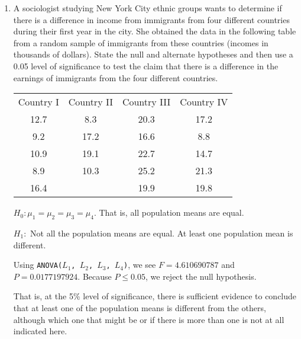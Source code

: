 \documentclass{article}
\begin{document}
\begin{enumerate}
\item A sociologist studying New York City ethnic groups wants to determine if there is a difference in income from immigrants from four different countries during their first year in the city.  She obtained the data in the following table from a random sample of immigrants from these countries (incomes in thousands of dollars).  State the null and alternate hypotheses and then use a 0.05 level of significance to test the claim that there is a difference in the earnings of immigrants from the four different countries. 

\begin{center}
\begin{tabular}{cccc}
Country I & Country II & Country III & Country IV \\
12.7 & 8.3 & 20.3 & 17.2 \\
9.2 & 17.2 & 16.6 & 8.8 \\
10.9 & 19.1 & 22.7 & 14.7 \\
8.9 & 10.3 & 25.2 & 21.3  \\
16.4 & & 19.9 & 19.8 \\
\end{tabular}
\end{center}

{\answer $H_0: \mu_1 = \mu_2 = \mu_3 = \mu_4$.  That is, all population means are equal. 

$H_1:$ Not all the population means are equal.  At least one population mean is different. 

Using \texttt{ANOVA($L_1$, $L_2$, $L_3$, $L_4$)}, we see $F= 4.610690787$ and $P=0.0177197924$.  Because $P \leq 0.05$, we reject the null hypothesis. 

That is, at the 5\% level of significance, there is sufficient evidence to conclude that at least one of the population means is different from the others, although which one that might be or if there is more than one is not at all indicated here.}	
\end{enumerate}
\vfill
\end{document}
